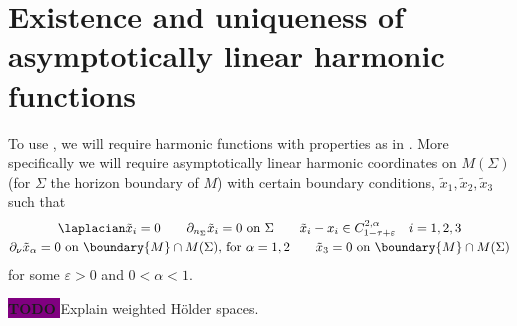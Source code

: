 \documentclass[titlepage,numbers=noenddot,headinclude,oneside,%
footinclude=true,cleardoublepage=empty,%
BCOR=5mm,paper=a4,fontsize=11pt,%
english,%
]{scrartcl}
\newcommand{\todomark}{%
    \colorbox{purple}{%
        \textnormal\ttfamily\bfseries\color{white}%
        TODO%
    }%
}
\newcommand{\todo}[1][]{%
    \ifstrempty{#1}{%
        \def\todotext{Todo}%
    }{%
        \def\todotext{Todo: #1}%
    }%
    \todomark%
    {%
        \marginpar{%
            \raggedright\normalfont\sffamily\scriptsize\todotext%
        }%
    }%
}
\begin{document}
\section{Existence and uniqueness of asymptotically linear harmonic functions}
To use , we will require harmonic functions with properties as in . More specifically we will require asymptotically linear harmonic coordinates on \( M(\Sigma) \) (for \( \Sigma \) the horizon boundary of \( M \)) with certain boundary conditions, \ie \( \tilde{x}_1,\tilde{x}_2,\tilde{x}_3 \) such that 
\begin{gather*}
    \laplacian \tilde{x}_i=0\quad \quad \partial_{n_\Sigma}\tilde{x}_i=0 \text{ on \( \Sigma \)}\qquad \tilde{x}_i-x_i\in C_{1-\tau+\varepsilon}^{2,\alpha}\quad i=1,2,3\\
    \partial_\nu \tilde{x}_\alpha=0 \text{ on \( \boundary{M} \cap M(\Sigma) \), for \( \alpha=1,2 \)}\qquad \tilde{x}_3=0 \text{ on \( \boundary{M}\cap M(\Sigma) \)}
\end{gather*}
for some \( \varepsilon>0 \) and \( 0<\alpha<1 \).

\todo{Explain weighted Hölder spaces.}
\end{document}
